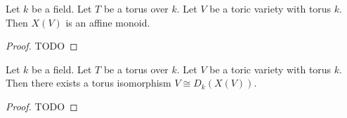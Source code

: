 \begin{proposition}
  \label{5-2-char-tor-var-aff-mon}

  Let $k$ be a field.
  Let $T$ be a torus over $k$.
  Let $V$ be a toric variety with torus $k$.
  Then $X(V)$ is an affine monoid.
\end{proposition}
\begin{proof}
  \uses{}

  TODO
\end{proof}


\begin{theorem}
  \label{5-1-aff-tor-var-iso-diag-aff-mon}

  Let $k$ be a field.
  Let $T$ be a torus over $k$.
  Let $V$ be a toric variety with torus $k$.
  Then there exists a torus isomorphism $V \cong D_k(X(V))$.
\end{theorem}
\begin{proof}

  TODO
\end{proof}
